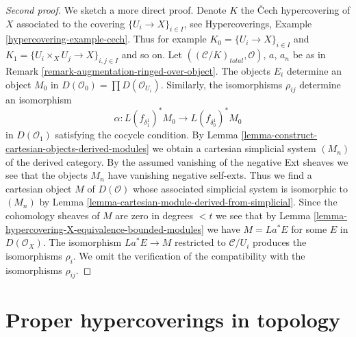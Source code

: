 \begin{proof}[Second proof]
We sketch a more direct proof.
Denote $K$ the {\v C}ech hypercovering of $X$ associated to the
covering $\{U_i \to X\}_{i \in I}$, see
Hypercoverings, Example \ref{hypercovering-example-cech}.
Thus for example $K_0 = \{U_i \to X\}_{i \in I}$ and
$K_1 = \{U_i \times_X U_j \to X\}_{i, j \in I}$ and so on.
Let $((\mathcal{C}/K)_{total}, \mathcal{O})$, $a$, $a_n$ be as in
Remark \ref{remark-augmentation-ringed-over-object}.
The objects $E_i$ determine an object $M_0$ in
$D(\mathcal{O}_0) = \prod D(\mathcal{O}_{U_i})$.
Similarly, the isomorphisms $\rho_{ij}$ determine an isomorphism
$$
\alpha :
L(f_{\delta_1^1})^*M_0
\longrightarrow
L(f_{\delta_0^1})^*M_0
$$
in $D(\mathcal{O}_1)$ satisfying the cocycle condition.
By Lemma \ref{lemma-construct-cartesian-objects-derived-modules}
we obtain a cartesian simplicial system $(M_n)$ of the derived
category. By the assumed vanishing of the negative Ext sheaves we see that
the objects $M_n$ have vanishing negative self-exts.
Thus we find a cartesian object $M$ of $D(\mathcal{O})$
whose associated simplicial system is isomorphic to $(M_n)$ by
Lemma \ref{lemma-cartesian-module-derived-from-simplicial}.
Since the cohomology sheaves of $M$ are zero in degrees $< t$
we see that by Lemma \ref{lemma-hypercovering-X-equivalence-bounded-modules}
we have $M = La^*E$ for some $E$ in $D(\mathcal{O}_X)$.
The isomorphism $La^*E \to M$ restricted to $\mathcal{C}/U_i$
produces the isomorphisms $\rho_i$. We omit the verification
of the compatibility with the isomorphisms $\rho_{ij}$.
\end{proof}












\section{Proper hypercoverings in topology}
\label{section-proper-hypercovering}

